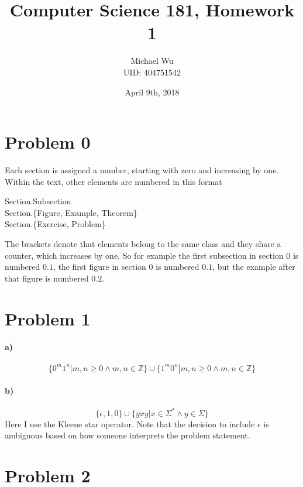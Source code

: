 \documentclass[12pt]{article}
\begin{document}
\title{Computer Science 181, Homework 1}
\date{April 9th, 2018}
\author{Michael Wu\\UID: 404751542}
\maketitle

\section*{Problem 0}

Each section is assigned a number, starting with zero and increasing by one. Within the text, other elements are numbered in this format
\begin{center}
        Section.Subsection\\
        Section.\{Figure, Example, Theorem\}\\
        Section.\{Exercise, Problem\}\\
\end{center}
The brackets denote that elements belong to the same class and they share a counter, which increases by one. So for example the first
subsection in section \(0\) is numbered \(0.1\), the first figure in section \(0\) is numbered \(0.1\), but the example after that figure
is numbered \(0.2\).

\section*{Problem 1}

\paragraph{a)}

\[\{0^m1^n|m,n\geq0 \wedge m,n\in\mathbb{Z} \}\cup\{1^m0^n|m,n\geq0 \wedge m,n\in\mathbb{Z}\}\]

\paragraph{b)}

\[\{\epsilon,1,0\}\cup\{yxy|x\in\Sigma^* \wedge y\in\Sigma\}\]
Here I use the Kleene star operator. Note that the decision to include \(\epsilon\) is ambiguous based on
how someone interprets the problem statement.

\section*{Problem 2}
\end{document}

